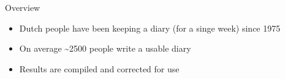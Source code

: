 \documentclass[aspectratio=169]{beamer}
\begin{document}
    {
    \begin{frame}{Overview}
        \begin{itemize}
            \item Dutch people have been keeping a diary (for a singe week) since 1975
            \item On average \textasciitilde2500 people write a usable diary
            \item Results are compiled and corrected for use
        \end{itemize}
    \end{frame}
    }
\end{document}
